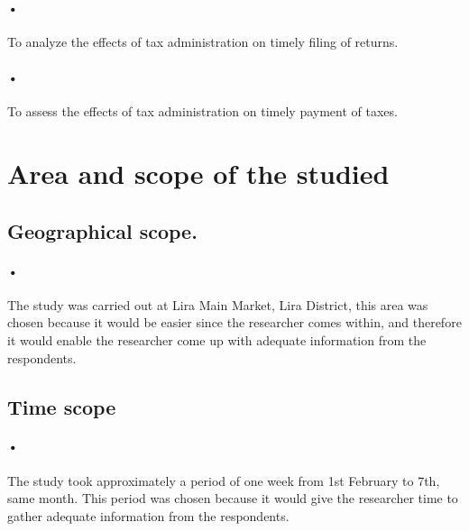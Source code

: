 \documentclass[12pt]{article}
\begin{document}
\paragraph{•}To analyze the effects of tax administration on timely filing of returns.
\paragraph{•}To assess the effects of tax administration on timely payment of taxes.

\section{Area and scope of the studied}
\subsection{Geographical scope.} 
\paragraph{•} The study was carried out at Lira Main Market, Lira District, this area was chosen because it would be easier since the researcher comes within, and therefore it would enable the researcher come up with adequate information from the respondents. 
\subsection{Time scope } 

\paragraph{•} The study took approximately a period of one week from 1st February to 7th, same month. This period was chosen because it would give the researcher time to gather adequate information from the respondents.
 
\end{document}
